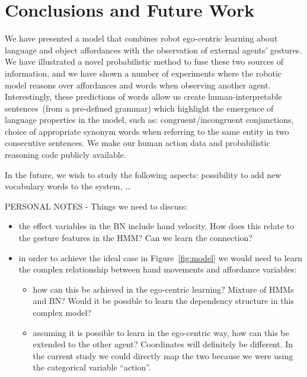 
\section{Conclusions and Future Work}
\label{sec:conclusions}

We have presented a model that combines robot ego-centric learning about language and object affordances with the observation of external agents' gestures.
We have illustrated a novel probabilistic method to fuse these two sources of information, and we have shown a number of experiments where the robotic model reasons over affordances and words when observing another agent.
Interestingly, these predictions of words allow us create human-interpretable sentences~(from a pre-defined grammar) which highlight the emergence of language properties in the model, such as:
congruent/incongruent conjunctions,
choice of appropriate synonym words when referring to the same entity in two consecutive sentences.
We make our human action data and probabilistic reasoning code publicly available.


In the future, we wish to study the following aspects:
possibility to add new vocabulary words to the system,
\dots

PERSONAL NOTES - Things we need to discuss:
\begin{itemize}
\item the effect variables in the BN include hand velocity. How does this relate to the gesture features in the HMM? Can we learn the connection?
\item in order to achieve the ideal case in Figure~\ref{fig:model} we would need to learn the complex relationship between hand movements and affordance variables:
  \begin{itemize}
  \item how can this be achieved in the ego-centric learning? Mixture of HMMs and BN? Would it be possible to learn the dependency structure in this complex model?
  \item assuming it is possible to learn in the ego-centric way, how can this be extended to the other agent? Coordinates will definitely be different. In the current study we could directly map the two because we were using the categorical variable ``action''.
  \end{itemize}
\end{itemize}

